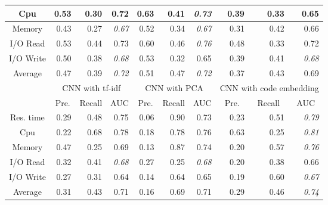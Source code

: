 \begin{table}
\begin{tabular}{|c|r|r|r|r|r|r|r|r|r|}
Cpu               & 0.53  & 0.30    & 0.72 & 0.63  & 0.41    & \textit{0.73}            & 0.39  & 0.33    & 0.65 \\ \hline
Memory            & 0.43  & 0.27    & \textit{0.67}            & 0.52  & 0.34    & \textit{0.67}            & 0.31  & 0.42    & 0.66 \\ \hline
I/O Read          & 0.53  & 0.44    & 0.73 & 0.60  & 0.46    & \textit{0.76}            & 0.48  & 0.33    & 0.72 \\ \hline
I/O Write         & 0.50  & 0.38    & \textit{0.68}            & 0.53  & 0.32    & 0.65 & 0.39  & 0.41    & \textit{0.68}            \\ \hline
Average           & 0.47  & 0.39    & \textit{0.72}            & 0.51  & 0.47    & \textit{0.72}            & 0.37  & 0.43    & 0.69 \\ \hline
\multirow{2}{*}{} & \multicolumn{3}{c|}{CNN with tf-idf}       & \multicolumn{3}{c|}{CNN with PCA}          & \multicolumn{3}{c|}{CNN with code embedding}                   \\ \cline{2-10} 
                  & \multicolumn{1}{c|}{Pre.} & \multicolumn{1}{c|}{Recall} & \multicolumn{1}{c|}{AUC} & \multicolumn{1}{c|}{Pre.} & \multicolumn{1}{c|}{Recall} & \multicolumn{1}{c|}{AUC} & \multicolumn{1}{c|}{Pre.} & \multicolumn{1}{c|}{Recall} & \multicolumn{1}{c|}{AUC} \\ \hline
Res. time         & 0.29  & 0.48    & 0.75 & 0.06  & 0.90    & 0.73 & 0.23  & 0.51    & \textit{0.79}            \\ \hline
Cpu               & 0.22  & 0.68    & 0.78 & 0.18  & 0.78    & 0.76 & 0.63  & 0.25    & \textit{0.81}            \\ \hline
Memory            & 0.47  & 0.25    & 0.69 & 0.13  & 0.87    & 0.74 & 0.20  & 0.57    & \textit{0.76}            \\ \hline
I/O Read          & 0.32  & 0.41    & \textit{0.68}            & 0.27  & 0.25    & \textit{0.68}            & 0.20  & 0.38    & 0.66 \\ \hline
I/O Write         & 0.27  & 0.31    & 0.64 & 0.14  & 0.64    & 0.65 & 0.19  & 0.60    & \textit{0.67}            \\ \hline
Average           & 0.31  & 0.43    & 0.71 & 0.16  & 0.69    & 0.71 & 0.29  & 0.46    & \textit{0.74}            \\ \hline
\end{tabular}

\label{tab:model_evaluation_hadoop}
\end{table}




